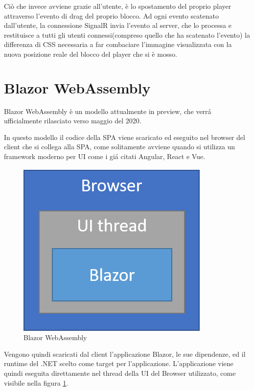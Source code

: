 Ci\`o che invece avviene grazie all'utente, \`e lo spostamento del proprio player attraverso l'evento di drag del proprio blocco.
Ad ogni evento scatenato dall'utente, la connessione SignalR invia l'evento al server, che lo processa e restituisce a tutti gli utenti connessi(compreso quello che ha scatenato l'evento) la differenza di CSS necessaria a far combaciare l'immagine visualizzata con la nuova posizione reale del blocco del player che si \`e mosso.

\pagebreak

\section{Blazor WebAssembly}\label{sez:bwa}
Blazor WebAssembly \`e un modello attualmente in preview, che verr\'a ufficialmente rilasciato verso maggio del 2020.

In questo modello il codice della SPA viene scaricato ed eseguito nel browser del client che si collega alla SPA, come solitamente avviene quando si utilizza un framework moderno per UI come i gi\'a citati Angular, React e Vue.

\begin{figure}[H]
	\centerline{\includegraphics[scale=0.6]{figure/blazor-WebAssembly.png}}
	\caption{Blazor WebAssembly}
	\label{fig:BlazorWebAssembly}
\end{figure}

Vengono quindi scaricati dal client l'applicazione Blazor, le sue dipendenze, ed il runtime del .NET scelto come target per l'applicazione.
L'applicazione viene quindi eseguita direttamente nel thread della UI del Browser utilizzato, come visibile nella figura \ref{fig:BlazorWebAssembly}.

